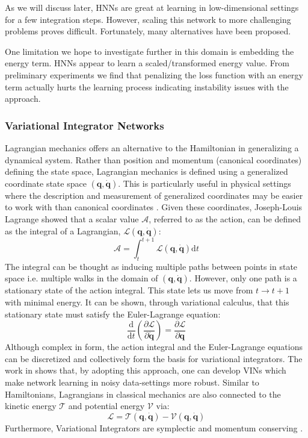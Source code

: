 \documentclass{article}
\begin{document}
As we will discuss later, HNNs are great at learning in low-dimensional settings for a few integration steps. However, scaling this network to more challenging problems proves difficult. Fortunately, many alternatives have been proposed. 

One limitation we hope to investigate further in this domain is embedding the energy term. HNNs appear to learn a scaled/transformed energy value. From preliminary experiments we find that penalizing the loss function with an energy term actually hurts the learning process indicating instability issues with the approach.

\subsubsection{Variational Integrator Networks}

Lagrangian mechanics offers an alternative to the Hamiltonian in generalizing a dynamical system. Rather than position and momentum (canonical coordinates) defining the state space, Lagrangian mechanics is defined using a generalized coordinate state space $(\mathbf{q},\dot{\mathbf{q}})$. This is particularly useful in physical settings where the description and measurement of generalized coordinates may be easier to work with than canonical coordinates \cite{marsden_discrete_2001}. Given these coordinates, Joseph-Louis Lagrange showed that a scalar value $\mathcal{A}$, referred to as the action, can be defined as the integral of a Lagrangian, $\mathcal{L}(\mathbf{q},\dot{\mathbf{q}})$:
\begin{equation}
\mathcal{A} = \int_{t}^{t+1} \mathcal{L}(\mathbf{q},\dot{\mathbf{q}}) \mathrm{d}t
\label{eqn.action_integral}
\end{equation}
The integral can be thought as inducing multiple paths between points in state space i.e. multiple walks in the domain of $(\mathbf{q},\mathbf{\dot{q}})$. However, only one path is a stationary state of the action integral. This state lets us move from $t \rightarrow t+1$ with minimal energy. It can be shown, through variational calculus, that this stationary state must satisfy the Euler-Lagrange equation:
\begin{equation}
\frac{\mathrm{d} }{\mathrm{d}t} \left ( \frac{\partial \mathcal{L}}{\partial \dot{\mathbf{q}}} \right )= \frac{\partial \mathcal{L}}{\partial \mathbf{q}}
\label{eqn.euler_lagrange}
\end{equation}
Although complex in form, the action integral and the Euler-Lagrange equations can be discretized and collectively form the basis for variational integrators. The work in \cite{saemundsson_variational_2019} shows that, by adopting this approach, one can develop VINs which make network learning in noisy data-settings more robust. Similar to Hamiltonians, Lagrangians in classical mechanics are also connected to the kinetic energy $\mathcal{T}$ and potential energy $\mathcal{V}$ via:
\begin{equation}
\mathcal{L} = \mathcal{T}(\mathbf{q},\mathbf{\dot{q}}) - \mathcal{V} (\mathbf{q},\mathbf{\dot{q}})
\end{equation}
Furthermore, Variational Integrators are symplectic and momentum conserving \cite{lew_overview_nodate}.
\end{document}
